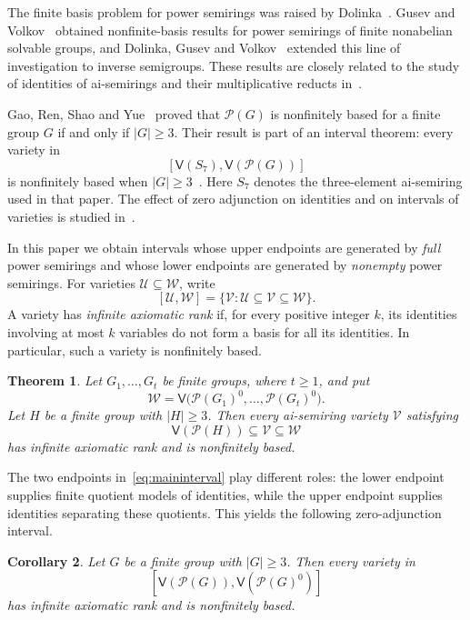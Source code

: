 \documentclass[10pt,a4paper]{amsart}
\newtheorem{theorem}{Theorem}[section]
\newtheorem{corollary}[theorem]{Corollary}
\numberwithin{equation}{section}
\newcommand{\Pow}{\mathcal{P}}
\newcommand{\Full}[1]{\mathcal{P}(#1)^0}
\newcommand{\Var}{\mathsf{V}}
\newcommand{\calU}{\mathcal{U}}
\newcommand{\calV}{\mathcal{V}}
\newcommand{\calW}{\mathcal{W}}
\renewcommand{\geq}{\geqslant}
\begin{document}
The finite basis problem for power semirings was raised by Dolinka~\cite{d}. Gusev and Volkov~\cite{gv} obtained nonfinite-basis results for power semirings of finite nonabelian solvable groups, and Dolinka, Gusev and Volkov~\cite{dgv} extended this line of investigation to inverse semigroups. These results are closely related to the study of identities of ai-semirings and their multiplicative reducts in~\cite{jrz}.

Gao, Ren, Shao and Yue~\cite{grsy} proved that $\Pow(G)$ is nonfinitely based for a finite group $G$ if and only if $|G|\geq 3$. Their result is part of an interval theorem: every variety in
\[
 [\Var(S_7),\Var(\Pow(G))]
\]
is nonfinitely based when $|G|\geq 3$~\cite[Corollary~3.5]{grsy}. Here $S_7$ denotes the three-element ai-semiring used in that paper. The effect of zero adjunction on identities and on intervals of varieties is studied in~\cite{wrz,grz}.

In this paper we obtain intervals whose upper endpoints are generated by \emph{full} power semirings and whose lower endpoints are generated by \emph{nonempty} power semirings. For varieties $\calU\subseteq\calW$, write
\[
 [\calU,\calW]=\{\calV:\calU\subseteq\calV\subseteq\calW\}.
\]
A variety has \emph{infinite axiomatic rank} if, for every positive integer $k$, its identities involving at most $k$ variables do not form a basis for all its identities. In particular, such a variety is nonfinitely based.


\begin{theorem}\label{thm:interval}
Let $G_1,\ldots,G_t$ be finite groups, where $t\geq 1$, and put
\[
 \calW=\Var\bigl(\Full{G_1},\ldots,\Full{G_t}\bigr).
\]
Let $H$ be a finite group with $|H|\geq 3$. Then every ai-semiring variety $\calV$ satisfying
\begin{equation}\label{eq:maininterval}
 \Var(\Pow(H))\subseteq\calV\subseteq\calW
\end{equation}
has infinite axiomatic rank and is nonfinitely based.
\end{theorem}


The two endpoints in~\eqref{eq:maininterval} play different roles: the lower endpoint supplies finite quotient models of identities, while the upper endpoint supplies identities separating these quotients. This yields the following zero-adjunction interval.

\begin{corollary}\label{cor:zerointerval}
Let $G$ be a finite group with $|G|\geq 3$. Then every variety in
\[
 [\Var(\Pow(G)),\Var(\Full{G})]
\]
has infinite axiomatic rank and is nonfinitely based.
\end{corollary}
\end{document}
